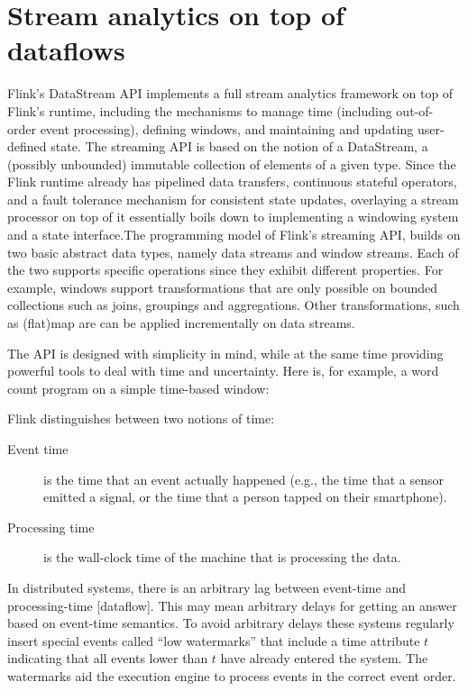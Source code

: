 \documentclass{sig-alternate}
\begin{document}


\section{Stream analytics on top of \\ dataflows}

Flink's DataStream API implements a full stream analytics framework on top of Flink's runtime, including the mechanisms to manage time (including out-of-order event processing), defining windows, and maintaining and updating user-defined state. The streaming API is based on the notion of a DataStream, a (possibly unbounded) immutable collection of elements of a given type. Since the Flink runtime already has pipelined data transfers, continuous stateful operators, and a fault tolerance mechanism for consistent state updates, overlaying a stream processor on top of it essentially boils down to implementing a windowing system and a state interface.The programming model of Flink's streaming API,  builds on two basic abstract data types, namely data streams and window streams. Each of the two supports specific operations since they exhibit different properties. For example, windows support transformations that are only possible on bounded collections such as joins, groupings and aggregations. Other transformations, such as (flat)map are  can be applied incrementally on data streams.

The API is designed with simplicity in mind, while at the same time providing powerful tools to deal with time and uncertainty. Here is, for example, a word count program on a simple  time-based window:


Flink distinguishes between two notions of time: 
\begin{description}
\item[Event time] is the time that an event actually happened (e.g., the time that a sensor emitted a signal, or the time that a person tapped on their smartphone).
\item[Processing time] is the wall-clock time of the machine that is processing the data.
\end{description}

In distributed systems, there is an arbitrary lag between event-time and processing-time [dataflow]. This may mean arbitrary delays for getting an answer based on event-time semantics. To avoid arbitrary delays these systems regularly insert special events called ``low watermarks''  that include a time attribute $t$ indicating that all events lower than $t$ have already entered the system. The watermarks aid the execution engine to process events in the correct event order. 
\end{document}
